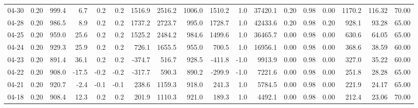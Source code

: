 \begin{threeparttable}
{\begin{tabular}{lrrrrrrrrrrrrrrrrr}
  04-30 &     0.20 &  999.4 &               6.7 &               0.2 &                0.2 &             1516.9 & 2516.2 & 1006.0 &     1510.2 &                      1.0 &             37420.1 &       0.20 &      0.98 &           0.00 &           1170.2 &          116.32 &                  70.00 \\
  04-28 &     0.20 &  986.5 &               8.9 &               0.2 &                0.2 &             1737.2 & 2723.7 &  995.0 &     1728.7 &                      1.0 &             42433.6 &       0.20 &      0.98 &           0.20 &            928.1 &           93.28 &                  65.00 \\
  04-25 &     0.20 &  959.0 &              25.6 &               0.2 &                0.2 &             1525.2 & 2484.2 &  984.6 &     1499.6 &                      1.0 &             36465.7 &       0.00 &      0.98 &           0.00 &            630.6 &           64.05 &                  65.00 \\
  04-24 &     0.20 &  929.3 &              25.9 &               0.2 &                0.2 &              726.1 & 1655.5 &  955.0 &      700.5 &                      1.0 &             16956.1 &       0.00 &      0.98 &           0.00 &            368.6 &           38.59 &                  60.00 \\
  04-23 &     0.20 &  891.4 &              36.1 &               0.2 &                0.2 &             -374.7 &  516.7 &  928.5 &     -411.8 &                     -1.0 &              9913.9 &       0.00 &      0.98 &           0.00 &            327.0 &           35.22 &                  60.00 \\
  04-22 &     0.20 &  908.0 &             -17.5 &              -0.2 &               -0.2 &             -317.7 &  590.3 &  890.2 &     -299.9 &                     -1.0 &              7221.6 &       0.00 &      0.98 &           0.00 &            251.8 &           28.28 &                  65.00 \\
  04-21 &     0.20 &  920.7 &              -2.4 &              -0.1 &               -0.1 &              238.6 & 1159.3 &  918.0 &      241.3 &                      1.0 &              5784.5 &       0.00 &      0.98 &           0.00 &            221.9 &           24.17 &                  65.00 \\
  04-18 &     0.20 &  908.4 &              12.3 &               0.2 &                0.2 &              201.9 & 1110.3 &  921.0 &      189.3 &                      1.0 &              4492.1 &       0.00 &      0.98 &           0.00 &            212.4 &           23.06 &                  70.00 \\

\end{tabular}}
\end{threeparttable}

